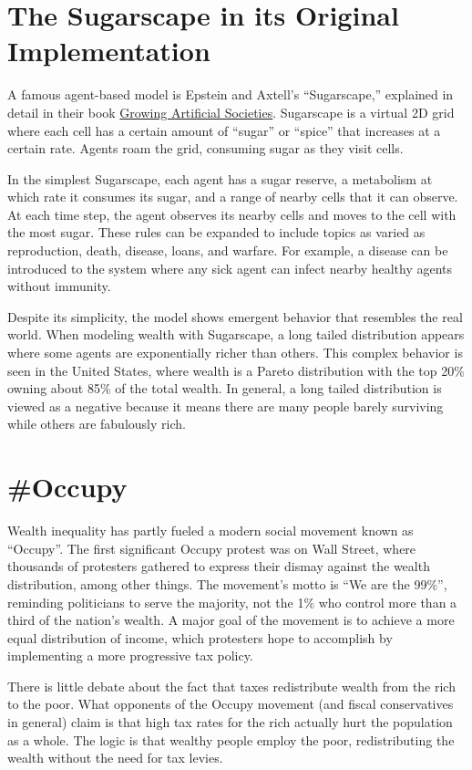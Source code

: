 
\section{The Sugarscape in its Original Implementation}

A famous agent-based model is Epstein and Axtell’s “Sugarscape,” explained in detail in their book \underline{Growing Artificial Societies}. Sugarscape is a virtual 2D grid where each cell has a certain amount of “sugar” or “spice” that increases at a certain rate. Agents roam the grid, consuming sugar as they visit cells.

In the simplest Sugarscape, each agent has a sugar reserve, a metabolism at which rate it consumes its sugar, and a range of nearby cells that it can observe. At each time step, the agent observes its nearby cells and moves to the cell with the most sugar. These rules can be expanded to include topics as varied as reproduction, death, disease, loans, and warfare. For example, a disease can be introduced to the system where any sick agent can infect nearby healthy agents without immunity.

Despite its simplicity, the model shows emergent behavior that resembles the real world. When modeling wealth with Sugarscape, a long tailed distribution appears where some agents are exponentially richer than others. This complex behavior is seen in the United States, where wealth is a Pareto distribution with the top 20\% owning about 85\% of the total wealth. In general, a long tailed distribution is viewed as a negative because it means there are many people barely surviving while others are fabulously rich. 

\section{\#Occupy}

Wealth inequality has partly fueled a modern social movement known as “Occupy”. The first significant Occupy protest was on Wall Street, where thousands of protesters gathered to express their dismay against the wealth distribution, among other things. The movement's motto is “We are the 99\%”, reminding politicians to serve the majority, not the 1\% who control more than a third of the nation's wealth. A major goal of the movement is to achieve a more equal distribution of income, which protesters hope to accomplish by implementing a more progressive tax policy. 

There is little debate about the fact that taxes redistribute wealth from the rich to the poor. What opponents of the Occupy movement (and fiscal conservatives in general) claim is that high tax rates for the rich actually hurt the population as a whole. The logic is that wealthy people employ the poor, redistributing the wealth without the need for tax levies. 

